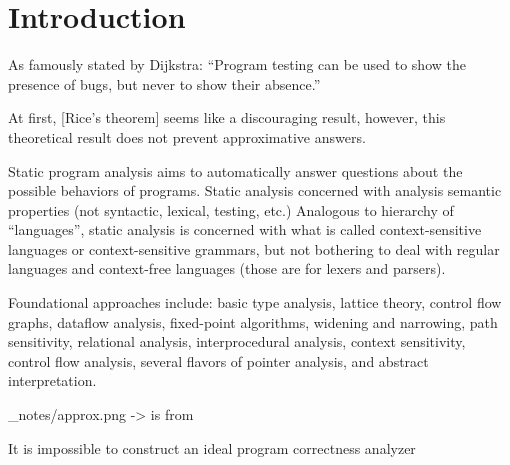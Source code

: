 \setcounter{section}{0}
\section{Introduction}\label{sec:introduction}

As famously stated by Dijkstra: “Program testing can be used to show the presence of bugs, but never to show their absence.”

At first, [Rice's theorem] seems like a discouraging result, however, this theoretical result does not prevent approximative answers.

Static program analysis aims to automatically answer questions about the possible behaviors of programs.
Static analysis concerned with analysis semantic properties (not syntactic, lexical, testing, etc.)
Analogous to hierarchy of “languages”, static analysis is concerned with what is called context-sensitive languages or context-sensitive grammars, but not bothering to deal with regular languages and context-free languages (those are for lexers and parsers).

Foundational approaches include: basic type analysis, lattice theory, control flow graphs, dataflow analysis, fixed-point algorithms, widening and narrowing, path sensitivity, relational analysis, interprocedural analysis, context sensitivity, control flow analysis, several flavors of pointer analysis, and abstract interpretation.

_notes/approx.png -> is from

It is impossible to construct an ideal program correctness analyzer









